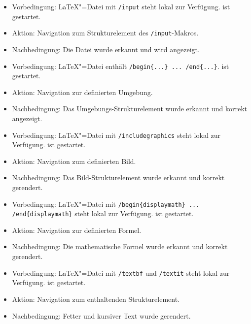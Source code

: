 \begin{itemize}
  \item Vorbedingung: \LaTeX"=Datei mit \verb|/input| steht lokal zur Verfügung.
  \texla{} ist gestartet.
  \item Aktion: Navigation zum Strukturelement des \verb|/input|-Makros.
  \item Nachbedingung: Die Datei wurde erkannt und wird angezeigt.
\end{itemize}

\begin{itemize}
  \item Vorbedingung: \LaTeX"=Datei enthält \verb|/begin{...} ... /end{...}|.
  \texla{} ist gestartet.
  \item Aktion: Navigation zur definierten Umgebung.
  \item Nachbedingung: Das Umgebungs-Strukturelement wurde erkannt und korrekt angezeigt.
\end{itemize}

\begin{itemize}
  \item Vorbedingung: \LaTeX"=Datei mit \verb|/includegraphics| steht lokal zur Verfügung.
  \texla{} ist gestartet.
  \item Aktion: Navigation zum definierten Bild.
  \item Nachbedingung: Das Bild-Strukturelement wurde erkannt und korrekt gerendert.
\end{itemize}

\begin{itemize}
  \item Vorbedingung: \LaTeX"=Datei mit \verb|/begin{displaymath} ... /end{displaymath}| steht lokal zur Verfügung.
  \texla{} ist gestartet.
  \item Aktion: Navigation zur definierten Formel.
  \item Nachbedingung: Die mathematische Formel wurde erkannt und korrekt gerendert.
\end{itemize}

\clearpage

\begin{itemize}
  \item Vorbedingung: \LaTeX"=Datei mit \verb|/textbf| und \verb|/textit| steht lokal zur Verfügung.
  \texla{} ist gestartet.
  \item Aktion: Navigation zum enthaltenden Strukturelement.
  \item Nachbedingung: Fetter und kursiver Text wurde gerendert.
\end{itemize}

